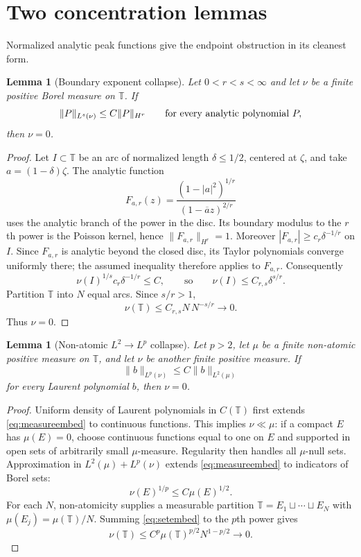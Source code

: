 \documentclass[11pt]{article}
\newtheorem{lemma}[theorem]{Lemma}
\newcommand{\T}{\mathbb T}
\begin{document}
\section{Two concentration lemmas}

Normalized analytic peak functions give the endpoint obstruction in its
cleanest form.

\begin{lemma}[Boundary exponent collapse]
\label{lem:hardymeasure}
Let $0<r<s<\infty$ and let $\nu$ be a finite positive Borel measure on $\T$.
If
\[
 \|P\|_{L^s(\nu)}\le C\|P\|_{H^r}
 \qquad\hbox{for every analytic polynomial }P,
\]
then $\nu=0$.
\end{lemma}

\begin{proof}
Let $I\subset\T$ be an arc of normalized length $\delta\le1/2$, centered at
$\zeta$, and take $a=(1-\delta)\zeta$.  The analytic function
\[
 F_{a,r}(z)=\frac{(1-|a|^2)^{1/r}}{(1-\overline a z)^{2/r}}
\]
uses the analytic branch of the power in the disc.  Its boundary modulus to
the $r$th power is the Poisson kernel, hence $\|F_{a,r}\|_{H^r}=1$.
Moreover $|F_{a,r}|\ge c_r\delta^{-1/r}$ on $I$.  Since $F_{a,r}$ is
analytic beyond the closed disc, its Taylor polynomials converge uniformly
there; the assumed inequality therefore applies to $F_{a,r}$.  Consequently
\[
 \nu(I)^{1/s}c_r\delta^{-1/r}\le C,
 \qquad\text{so}\qquad
 \nu(I)\le C_{r,s}\delta^{s/r}.
\]
Partition $\T$ into $N$ equal arcs.  Since $s/r>1$,
\[
 \nu(\T)\le C_{r,s}N\,N^{-s/r}\longrightarrow0.
\]
Thus $\nu=0$.
\end{proof}

\begin{lemma}[Non-atomic $L^2\to L^p$ collapse]
\label{lem:nonatomic}
Let $p>2$, let $\mu$ be a finite non-atomic positive measure on $\T$, and
let $\nu$ be another finite positive measure.  If
\[
 \|b\|_{L^p(\nu)}\le C\|b\|_{L^2(\mu)}
 \tag{3.1}\label{eq:measureembed}
\]
for every Laurent polynomial $b$, then $\nu=0$.
\end{lemma}

\begin{proof}
Uniform density of Laurent polynomials in $C(\T)$ first extends
\eqref{eq:measureembed} to continuous functions.  This implies
$\nu\ll\mu$: if a compact $E$ has $\mu(E)=0$, choose continuous functions
equal to one on $E$ and supported in open sets of arbitrarily small
$\mu$-measure.  Regularity then handles all $\mu$-null sets.
Approximation in $L^2(\mu)+L^p(\nu)$ extends \eqref{eq:measureembed} to
indicators of Borel sets:
\[
 \nu(E)^{1/p}\le C\mu(E)^{1/2}.
 \tag{3.2}\label{eq:setembed}
\]
For each $N$, non-atomicity supplies a measurable partition
$\T=E_1\sqcup\cdots\sqcup E_N$ with
$\mu(E_j)=\mu(\T)/N$.  Summing \eqref{eq:setembed} to the $p$th power gives
\[
 \nu(\T)\le C^p\mu(\T)^{p/2}N^{1-p/2}\longrightarrow0.
\]
\end{proof}
\end{document}
